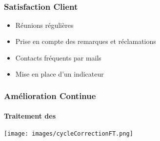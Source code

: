 \subsection{} %

\begin{frame}
\frametitle{Satisfaction Client}
	\begin{itemize}
		\item Réunions régulières
		\item Prise en compte des remarques et réclamations
		\item Contacts fréquents par mails
		\item Mise en place d'un indicateur
	\end{itemize}
\end{frame}

\begin{frame}
\frametitle{Amélioration Continue}
\framesubtitle{Traitement des \FT{}}
\texttt{[image: images/cycleCorrectionFT.png]}
\end{frame}